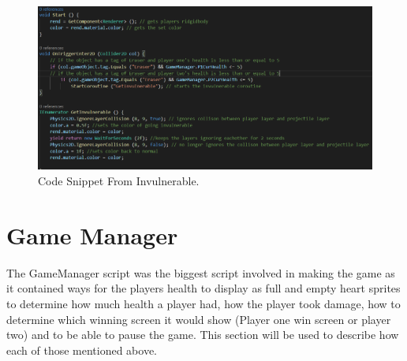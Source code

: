\begin{figure}[h]
\centering
  \includegraphics[width= 0.9\linewidth]{Images/Invulnerable.PNG}
  \caption{Code Snippet From Invulnerable.}
  \label{fig:Invulnerable}
\end{figure}
\newpage

\section{Game Manager}
The GameManager script was the biggest script involved in making the game as it contained ways for the players health to display as full and empty heart sprites to determine how much health a player had, how the player took damage, how to determine which winning screen it would show (Player one win screen or player two) and to be able to pause the game. This section will be used to describe how each of those mentioned above.

